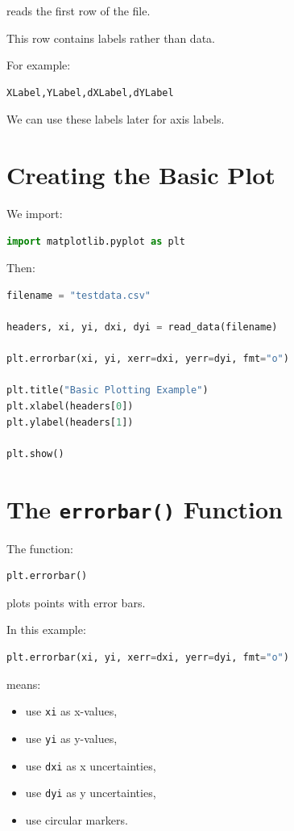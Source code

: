 \documentclass[11pt]{article}
\begin{document}
reads the first row of the file.

This row contains labels rather than data.

For example:

\begin{lstlisting}
XLabel,YLabel,dXLabel,dYLabel
\end{lstlisting}

We can use these labels later for axis labels.

\section{Creating the Basic Plot}

We import:

\begin{lstlisting}[language=Python]
import matplotlib.pyplot as plt
\end{lstlisting}

Then:

\begin{lstlisting}[language=Python]
filename = "testdata.csv"

headers, xi, yi, dxi, dyi = read_data(filename)

plt.errorbar(xi, yi, xerr=dxi, yerr=dyi, fmt="o")

plt.title("Basic Plotting Example")
plt.xlabel(headers[0])
plt.ylabel(headers[1])

plt.show()
\end{lstlisting}

\section{The \texttt{errorbar()} Function}

The function:

\begin{lstlisting}[language=Python]
plt.errorbar()
\end{lstlisting}

plots points with error bars.

In this example:

\begin{lstlisting}[language=Python]
plt.errorbar(xi, yi, xerr=dxi, yerr=dyi, fmt="o")
\end{lstlisting}

means:

\begin{itemize}
    \item use \texttt{xi} as x-values,
    \item use \texttt{yi} as y-values,
    \item use \texttt{dxi} as x uncertainties,
    \item use \texttt{dyi} as y uncertainties,
    \item use circular markers.
\end{itemize}
\end{document}
